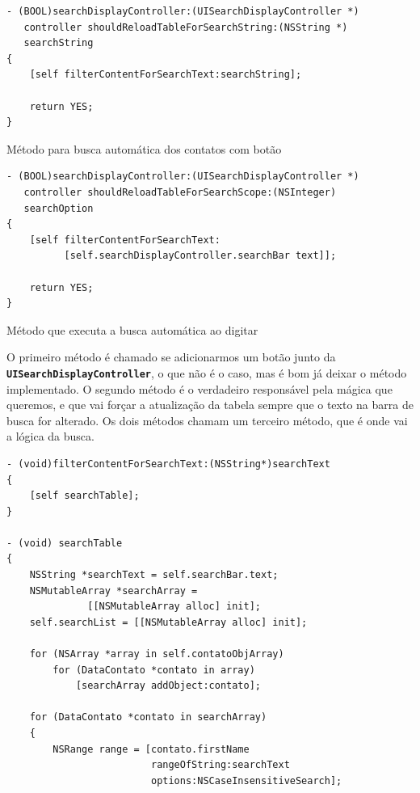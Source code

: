 \documentclass[a4paper,12pt,brazil,doubleside]{book}
\begin{document}
\begin{singlespace}
\begin{listing}[H]
\begin{verbatim}
- (BOOL)searchDisplayController:(UISearchDisplayController *)
   controller shouldReloadTableForSearchString:(NSString *)
   searchString
{
    [self filterContentForSearchText:searchString];

    return YES;
}
\end{verbatim}
\caption{Método para busca automática dos contatos com botão}
\end{listing}

\begin{listing}[H]
\begin{verbatim}
- (BOOL)searchDisplayController:(UISearchDisplayController *)
   controller shouldReloadTableForSearchScope:(NSInteger)
   searchOption
{
    [self filterContentForSearchText:
          [self.searchDisplayController.searchBar text]];
    
    return YES;
}
\end{verbatim}
\caption{Método que executa a busca automática ao digitar}
\end{listing}


O primeiro método é chamado se adicionarmos um botão junto da\\
\texttt{\textbf{UISearchDisplayController}}, o que não é o caso, mas é bom já deixar o método implementado. O segundo método é o verdadeiro responsável pela mágica que queremos, e que vai forçar a atualização da tabela sempre que o texto na barra de busca for alterado. Os dois métodos chamam um terceiro método, que é onde vai a lógica da busca.

\begin{listing}[H]
\begin{verbatim}
- (void)filterContentForSearchText:(NSString*)searchText
{
    [self searchTable];
}

- (void) searchTable
{
    NSString *searchText = self.searchBar.text;
    NSMutableArray *searchArray =
              [[NSMutableArray alloc] init];
    self.searchList = [[NSMutableArray alloc] init];
    
    for (NSArray *array in self.contatoObjArray)
        for (DataContato *contato in array)
            [searchArray addObject:contato];
    
    for (DataContato *contato in searchArray)
    {
        NSRange range = [contato.firstName
                         rangeOfString:searchText
                         options:NSCaseInsensitiveSearch];
        

\end{verbatim}
\end{listing}
\end{singlespace}
\end{document}
